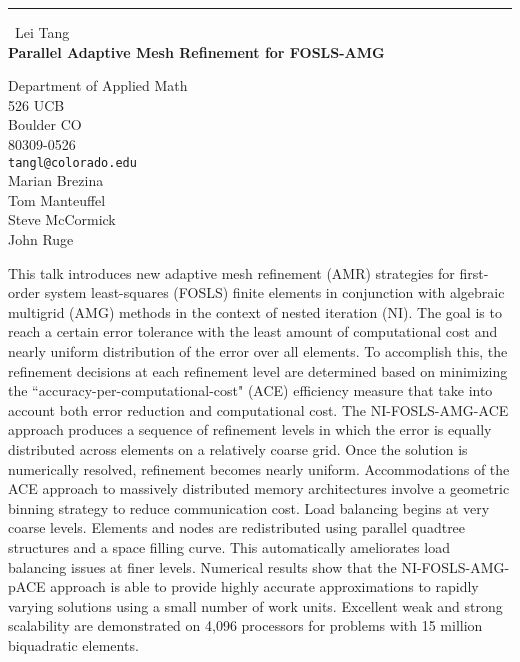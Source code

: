 \documentclass{report}
\begin{document}
\begin{center}
\rule{6in}{1pt} \
{\large Lei Tang \\
{\bf Parallel Adaptive Mesh Refinement for FOSLS-AMG}}

Department of Applied Math \\ 526 UCB \\ Boulder CO \\ 80309-0526
\\
{\tt tangl@colorado.edu}\\
Marian Brezina\\
Tom Manteuffel\\
Steve McCormick\\
John Ruge\end{center}

This talk introduces new adaptive mesh refinement (AMR) strategies for first-order system
least-squares (FOSLS) finite elements in conjunction with algebraic
multigrid (AMG) methods in the context of nested iteration (NI). The goal
is to reach a certain error tolerance with the least amount of
computational cost and nearly uniform distribution of the error over all
elements. To accomplish this, the refinement decisions at each refinement
level are determined based on minimizing the
``accuracy-per-computational-cost" (ACE) efficiency measure that take
into account both error reduction and computational cost. The
NI-FOSLS-AMG-ACE approach
produces a sequence of refinement levels in which the error is equally
distributed across elements on a relatively coarse grid. Once the
solution is numerically resolved, refinement becomes nearly uniform.
Accommodations of the ACE approach to massively distributed memory
architectures involve a geometric binning strategy to reduce
communication cost. Load balancing begins at very coarse levels. Elements
and nodes are redistributed using parallel quadtree structures and a
space filling curve. This automatically ameliorates load balancing issues
at finer levels. Numerical results show that the NI-FOSLS-AMG-pACE
approach is able to provide highly accurate approximations to rapidly
varying solutions using a small number of work units. Excellent weak and
strong scalability are demonstrated on 4,096 processors for problems with
15 million biquadratic elements.
\end{document}
